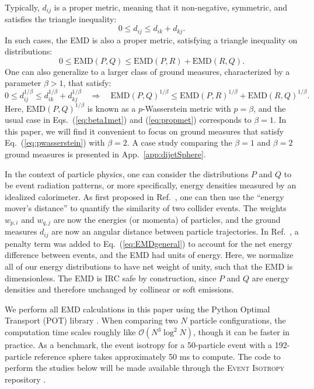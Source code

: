 \documentclass[letterpaper,11pt]{article}
\DeclareRobustCommand{\App}[1]{App.~\ref{#1}}
\DeclareRobustCommand{\Eq}[1]{Eq.~(\ref{#1})}
\DeclareRobustCommand{\Eqs}[2]{Eqs.~(\ref{#1}) and (\ref{#2})}
\DeclareRobustCommand{\Ref}[1]{Ref.~\cite{#1}}
\begin{document}
Typically, $d_{ij}$ is a proper metric, meaning that it non-negative, symmetric, and satisfies the triangle inequality:
%
\begin{equation}
0 \le d_{ij} \le d_{ik} + d_{kj}.
\label{eq:beta1met}
\end{equation}
%
In such cases, the EMD is also a proper metric, satisfying a triangle inequality on distributions:
%
\begin{equation}
0 \le \text{EMD}(P,Q) \le \text{EMD}(P, R) + \text{EMD}(R,Q).
\label{eq:propmet}
\end{equation}
%
One can also generalize to a larger class of ground measures, characterized by a parameter $\beta > 1$, that satisfy:
%
\begin{equation}
\label{eq:pwasserstein}
0 \le d_{ij}^{1/\beta} \le d_{ik}^{1/\beta} + d_{kj}^{1/\beta} \quad \Rightarrow \quad \text{EMD}(P, Q)^{1/\beta} \le \text{EMD}(P,R)^{1/\beta} + \text{EMD}(R,Q)^{1/\beta}.
\end{equation}
%
Here, $\text{EMD}(P, Q)^{1/\beta}$ is known as a $p$-Wasserstein metric with $p=\beta$, and the usual case in \Eqs{eq:beta1met}{eq:propmet} corresponds to $\beta = 1$.
%
In this paper, we will find it convenient to focus on ground measures that satisfy \Eq{eq:pwasserstein} with $\beta = 2$.
%
A case study comparing the $\beta=1$ and $\beta=2$ ground measures is presented in \App{app:dijetSphere}.


In the context of particle physics, one can consider the distributions $P$ and $Q$ to be event radiation patterns, or more specifically, energy densities measured by an idealized calorimeter. 
%
As first proposed in \Ref{Komiske:2019fks}, one can then use the ``energy mover's distance'' to quantify the similarity of two collider events. 
%
The weights $w_{p,i}$ and $w_{q,j}$ are now the energies (or momenta) of particles, and the ground measures $d_{ij}$ are now an angular distance between particle trajectories.
%
In \Ref{Komiske:2019fks}, a penalty term was added to \Eq{eq:EMDgeneral} to account for the net energy difference between events, and the EMD had units of energy.
%
Here, we normalize all of our energy distributions to have net weight of unity, such that the EMD is dimensionless.
%
The EMD is IRC safe by construction, since $P$ and $Q$ are energy densities and therefore unchanged by collinear or soft emissions.


We perform all EMD calculations in this paper using the Python Optimal Transport (POT) library \cite{flamary2017pot}.
%
When comparing two $N$ particle configurations, the computation time scales roughly like $\mathcal{O}(N^3 \log^2 N)$, though it can be faster in practice.
%
As a benchmark, the event isotropy for a 50-particle event with a 192-particle reference sphere takes approximately 50 ms to compute.
%
The code to perform the studies below will be made available through the \textsc{Event Isotropy} repository \cite{cesarotti:2020ei}.
\end{document}

